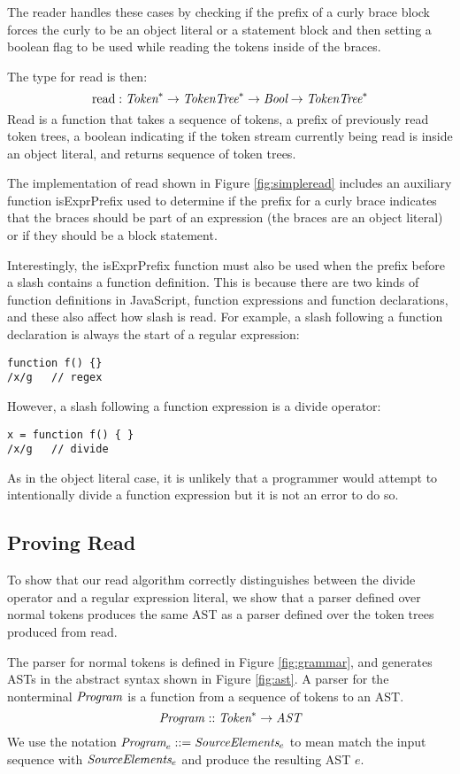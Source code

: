 \documentclass[preprint,10pt]{sigplanconf}
\begin{document}
The reader handles these cases by checking if the prefix of a curly
brace block forces the curly to be an object literal or a statement
block and then setting a boolean flag to be used while reading the
tokens inside of the braces.

The type for read is then:
\[
\textrm{read} : \textit{Token}^{*} \rightarrow \textit{TokenTree}^{*} 
\rightarrow \textit{Bool} \rightarrow \textit{TokenTree}^{*}
\]
Read is a function that takes a sequence of tokens, a prefix of previously read token trees, a boolean indicating if the token stream currently being read is inside an object literal, and returns sequence of token trees.

The implementation of read shown in Figure \ref{fig:simpleread} includes an auxiliary function isExprPrefix used to determine if the prefix for a curly brace indicates that the braces should be part of an expression (\ie the braces are an object literal) or if they should be a block statement.

Interestingly, the isExprPrefix function must also be used when the prefix before a slash contains a function definition. This is because there are two kinds of function definitions in JavaScript, function expressions and function declarations, and these also affect how slash is read. For example, a slash following a function declaration is always the start of a regular expression:
\begin{lstlisting}
function f() {}
/x/g   // regex
\end{lstlisting}
However, a slash following a function expression is a divide operator:
\begin{lstlisting}
x = function f() { } 
/x/g   // divide
\end{lstlisting}
As in the object literal case, it is unlikely that a programmer would attempt to intentionally divide a function expression but it is not an error to do so.

\subsection{Proving Read}

To show that our read algorithm correctly distinguishes between the
divide operator and a regular expression literal, we show that
a parser defined over normal tokens produces the same AST as a parser
defined over the token trees produced from read.

The parser for normal tokens is defined in Figure \ref{fig:grammar},
and generates ASTs in the abstract syntax shown in Figure \ref{fig:ast}. A
parser for the nonterminal \( \textit{Program}_{} \) is a function from a
sequence of tokens to an AST.
\[
\textit{Program}_{} :: \textit{Token}^* \rightarrow \textit{AST}
\]
We use the notation $\textit{Program}_{e} ::= \textit{SourceElements}_{e}$
to mean match the input sequence with $\textit{SourceElements}_{e}$ and
produce the resulting AST $e$.
\end{document}
